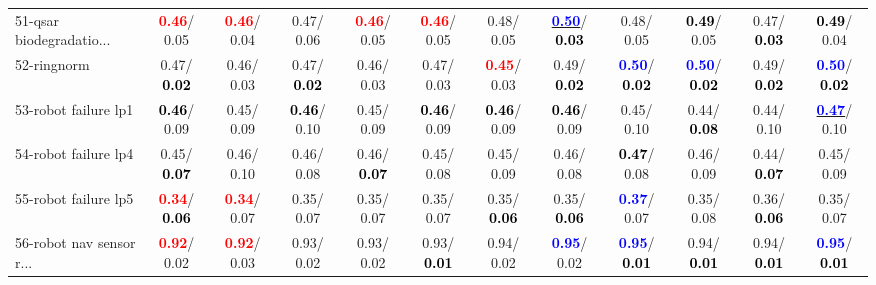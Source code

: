 \begin{table}[h]
\begin{center}
{\begin{tabular}{lc|c|c|c|c|c|c|c|c|c|c}
51-qsar biodegradatio... & \textcolor{red}{\textbf{  0.46}}/  0.05 & \textcolor{red}{\textbf{  0.46}}/  0.04 &   0.47/  0.06 & \textcolor{red}{\textbf{  0.46}}/  0.05 & \textcolor{red}{\textbf{  0.46}}/  0.05 &   0.48/  0.05 & \underline{\textcolor{blue}{\textbf{  0.50}}}/\textcolor{black}{\textbf{  0.03}} &   0.48/  0.05 & \textcolor{black}{\textbf{  0.49}}/  0.05 &   0.47/\textcolor{black}{\textbf{  0.03}} & \textcolor{black}{\textbf{  0.49}}/  0.04 \\
52-ringnorm &   0.47/\textcolor{black}{\textbf{  0.02}} &   0.46/  0.03 &   0.47/\textcolor{black}{\textbf{  0.02}} &   0.46/  0.03 &   0.47/  0.03 & \textcolor{red}{\textbf{  0.45}}/  0.03 &   0.49/\textcolor{black}{\textbf{  0.02}} & \textcolor{blue}{\textbf{  0.50}}/\textcolor{black}{\textbf{  0.02}} & \textcolor{blue}{\textbf{  0.50}}/\textcolor{black}{\textbf{  0.02}} &   0.49/\textcolor{black}{\textbf{  0.02}} & \textcolor{blue}{\textbf{  0.50}}/\textcolor{black}{\textbf{  0.02}} \\
53-robot failure lp1 & \textcolor{black}{\textbf{  0.46}}/  0.09 &   0.45/  0.09 & \textcolor{black}{\textbf{  0.46}}/  0.10 &   0.45/  0.09 & \textcolor{black}{\textbf{  0.46}}/  0.09 & \textcolor{black}{\textbf{  0.46}}/  0.09 & \textcolor{black}{\textbf{  0.46}}/  0.09 &   0.45/  0.10 &   0.44/\textcolor{black}{\textbf{  0.08}} &   0.44/  0.10 & \underline{\textcolor{blue}{\textbf{  0.47}}}/  0.10 \\ \hline
54-robot failure lp4 &   0.45/\textcolor{black}{\textbf{  0.07}} &   0.46/  0.10 &   0.46/  0.08 &   0.46/\textcolor{black}{\textbf{  0.07}} &   0.45/  0.08 &   0.45/  0.09 &   0.46/  0.08 & \textcolor{black}{\textbf{  0.47}}/  0.08 &   0.46/  0.09 &   0.44/\textcolor{black}{\textbf{  0.07}} &   0.45/  0.09 \\
55-robot failure lp5 & \textcolor{red}{\textbf{  0.34}}/\textcolor{black}{\textbf{  0.06}} & \textcolor{red}{\textbf{  0.34}}/  0.07 &   0.35/  0.07 &   0.35/  0.07 &   0.35/  0.07 &   0.35/\textcolor{black}{\textbf{  0.06}} &   0.35/\textcolor{black}{\textbf{  0.06}} & \textcolor{blue}{\textbf{  0.37}}/  0.07 &   0.35/  0.08 &   0.36/\textcolor{black}{\textbf{  0.06}} &   0.35/  0.07 \\
56-robot nav sensor r... & \textcolor{red}{\textbf{  0.92}}/  0.02 & \textcolor{red}{\textbf{  0.92}}/  0.03 &   0.93/  0.02 &   0.93/  0.02 &   0.93/\textcolor{black}{\textbf{  0.01}} &   0.94/  0.02 & \textcolor{blue}{\textbf{  0.95}}/  0.02 & \textcolor{blue}{\textbf{  0.95}}/\textcolor{black}{\textbf{  0.01}} &   0.94/\textcolor{black}{\textbf{  0.01}} &   0.94/\textcolor{black}{\textbf{  0.01}} & \textcolor{blue}{\textbf{  0.95}}/\textcolor{black}{\textbf{  0.01}} \\

\end{tabular}}
\end{center}
\end{table}
